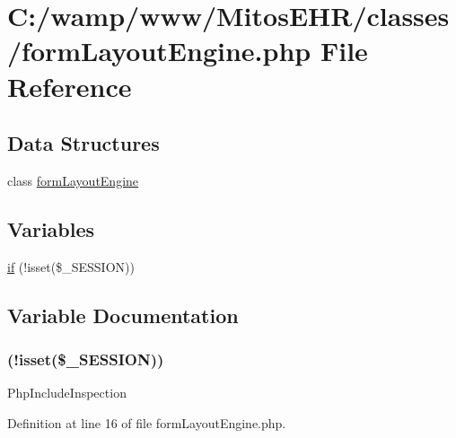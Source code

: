 \hypertarget{form_layout_engine_8php}{\section{\-C\-:/wamp/www/\-Mitos\-E\-H\-R/classes/form\-Layout\-Engine.php \-File \-Reference}
\label{form_layout_engine_8php}
}
\subsection*{\-Data \-Structures}
\begin{DoxyCompactItemize}
\item 
class \hyperlink{classform_layout_engine}{form\-Layout\-Engine}
\end{DoxyCompactItemize}
\subsection*{\-Variables}
\begin{DoxyCompactItemize}
\item 
\hyperlink{form_layout_engine_8php_a8ceca98aa29914fd2479a84a8d2242fb}{if} (!isset(\$\-\_\-\-S\-E\-S\-S\-I\-O\-N))
\end{DoxyCompactItemize}


\subsection{\-Variable \-Documentation}
\hypertarget{form_layout_engine_8php_a8ceca98aa29914fd2479a84a8d2242fb}{
\subsubsection[{if}]{(!isset(\$\-\_\-\-S\-E\-S\-S\-I\-O\-N))}}\label{form_layout_engine_8php_a8ceca98aa29914fd2479a84a8d2242fb}
\-Php\-Include\-Inspection 

\-Definition at line 16 of file form\-Layout\-Engine.\-php.

